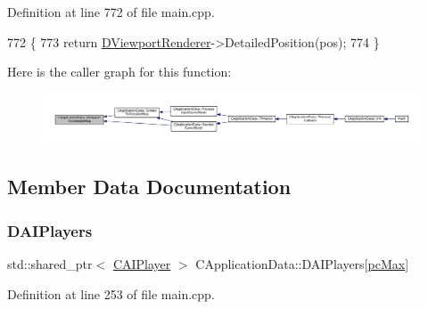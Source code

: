 Definition at line 772 of file main.\+cpp.


\begin{DoxyCode}
772                                                                      \{
773     \textcolor{keywordflow}{return} \hyperlink{classCApplicationData_a31da050ebca942272344c8b736d72848}{DViewportRenderer}->DetailedPosition(pos);
774 \}
\end{DoxyCode}
Here is the caller graph for this function\+:
\nopagebreak
\begin{figure}[H]
\begin{center}
\leavevmode
\includegraphics[width=350pt]{classCApplicationData_a2871f1b0855d14ed77db1abd83585d64_icgraph}
\end{center}
\end{figure}


\subsection{Member Data Documentation}
\hypertarget{classCApplicationData_a839f21d18d88deb29fe1196a8efc6096}{}\label{classCApplicationData_a839f21d18d88deb29fe1196a8efc6096} 
\subsubsection{\texorpdfstring{D\+A\+I\+Players}{DAIPlayers}}
{\footnotesize\ttfamily std\+::shared\+\_\+ptr$<$ \hyperlink{classCAIPlayer}{C\+A\+I\+Player} $>$ C\+Application\+Data\+::\+D\+A\+I\+Players\mbox{[}\hyperlink{GameDataTypes_8h_aafb0ca75933357ff28a6d7efbdd7602fa594a5c8dd3987f24e8a0f23f1a72cd34}{pc\+Max}\mbox{]}\hspace{0.3cm}{\ttfamily [protected]}}



Definition at line 253 of file main.\+cpp.

\hypertarget{classCApplicationData_a5c617fcea02a399ecffee313eead2159}{}\label{classCApplicationData_a5c617fcea02a399ecffee313eead2159} 
